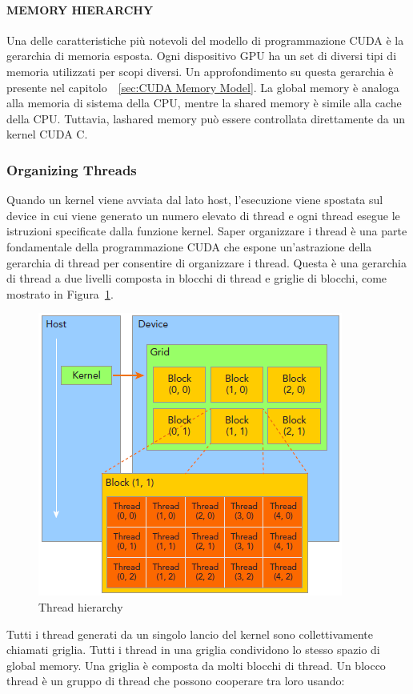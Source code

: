 \paragraph{MEMORY HIERARCHY}
Una delle caratteristiche più notevoli del modello di programmazione CUDA è la gerarchia di memoria esposta. Ogni dispositivo GPU ha un set di diversi tipi di memoria utilizzati per scopi diversi. Un approfondimento su questa gerarchia è presente nel capitolo~~\ref{sec:CUDA Memory Model}. La global memory è analoga alla memoria di sistema della CPU, mentre la shared memory è simile alla cache della CPU. Tuttavia, lashared memory può essere controllata direttamente da un kernel CUDA C.

\subsubsection{Organizing Threads}
Quando un kernel viene avviata dal lato host, l'esecuzione viene spostata sul device in cui viene generato un numero elevato di thread e ogni thread esegue le istruzioni specificate dalla funzione kernel. Saper organizzare i thread è una parte fondamentale della programmazione CUDA che espone un'astrazione della gerarchia di thread per consentire di organizzare i thread. Questa è una gerarchia di thread a due livelli composta in blocchi di thread e griglie di blocchi, come mostrato in Figura~\ref{fig:Thread_hierarchy}.
\begin{figure}[h!]
	\centering
	\includegraphics[width=.7\textwidth]{Immagini/CUDA/Thread_hierarchy}
	\caption{Thread hierarchy \cite{Cheng:ProfessionalCudaProgramming}}
	\label{fig:Thread_hierarchy}
\end{figure}
Tutti i thread generati da un singolo lancio del kernel sono collettivamente chiamati griglia. Tutti i thread in una griglia condividono lo stesso spazio di global memory. Una griglia è composta da molti blocchi di thread. Un blocco thread è un gruppo di thread che possono cooperare tra loro usando:
